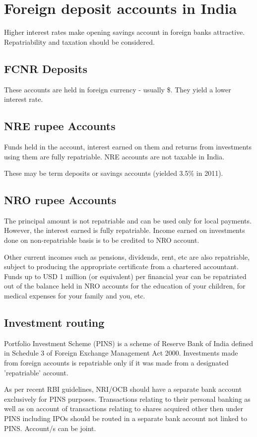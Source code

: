 \documentclass[oneside, article]{memoir}
\begin{document}
\section{Foreign deposit accounts in India}
Higher interest rates make opening savings account in foreign banks attractive. Repatriability and taxation should be considered.

\subsection{FCNR Deposits}
These accounts are held in foreign currency - usually \$. They yield a lower interest rate.

\subsection{NRE rupee Accounts}
Funds held in the account, interest earned on them and returns from investments using them are fully repatriable. NRE accounts are not taxable in India.

These may be term deposits or savings accounts (yielded 3.5\% in 2011). 

\subsection{NRO rupee Accounts}
The principal amount is not repatriable and can be used only for local payments. However, the interest earned is fully repatriable.  Income earned on investments done on non-repatriable basis is to be credited to NRO account.

Other current incomes such as pensions, dividends, rent, etc are also repatriable, subject to producing the appropriate certificate from a chartered accountant. Funds up to USD 1 million (or equivalent) per financial year can be repatriated out of the balance held in NRO accounts for the education of your children, for medical expenses for your family and you, etc. 

\subsection{Investment routing}
Portfolio Investment Scheme (PINS) is a scheme of Reserve Bank of India defined in Schedule 3 of Foreign Exchange Management Act 2000. Investments made from foreign accounts is repatriable only if it was made from a designated 'repatriable' account.

\subitem As per recent RBI guidelines, NRI/OCB should have a separate bank account exclusively for PINS purposes. Transactions relating to their personal banking as well as on account of transactions relating to shares acquired other then under PINS including IPOs should be routed in a separate bank account not linked to PINS. Account/s can be joint.
\end{document}
